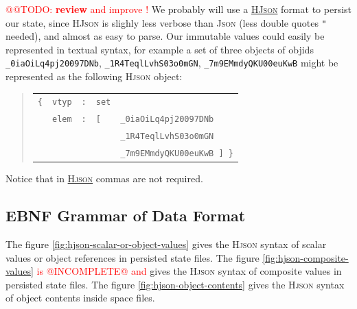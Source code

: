\documentclass[11pt,a4paper,svgnames]{article}
\begin{document}
       
{\textcolor{red}{@@TODO: \textbf{review} and improve !}} We probably will use a \href{http://hjson.org}{\textsc{HJson}} format
to persist our state, since \textsc{HJson} is slighly less verbose
than \textsc{Json} (less double quotes \texttt{"} needed), and almost
as easy to parse. Our immutable values could easily be represented in
textual syntax, for example a set of three objects of objids
\texttt{\_0iaOiLq4pj20097DNb}, \texttt{\_1R4TeqlLvhS03o0mGN},
\texttt{\_7m9EMmdyQKU00euKwB} might be represented as the following
\textsc{Hjson} object:
\begin{quote}
\begin{relsize}{-1}
  \begin{tabular}{lllll}
    \texttt{\{} & \texttt{vtyp} & \texttt{:} & \texttt{set} & ~  \\
    ~           & \texttt{elem} & \texttt{:} & \texttt{[} & \texttt{\_0iaOiLq4pj20097DNb}  \\
    ~           & ~             & ~          & ~           & \texttt{\_1R4TeqlLvhS03o0mGN} \\
    ~           & ~             & ~          & ~           & \texttt{\_7m9EMmdyQKU00euKwB ] \}} \\
  \end{tabular}
\end{relsize}
\end{quote}

\smallskip
Notice that in \href{http://hjson.org/}{\textsc{Hjson}} commas are not required.
\medskip


\subsection{EBNF Grammar of Data Format}
\label{subsec:data-format-ebnf}


The figure \ref{fig:hjson-scalar-or-object-values} gives the
\textsc{Hjson} syntax of scalar values or object references in
persisted state files.  The figure \ref{fig:hjson-composite-values}
\textcolor{red}{is @INCOMPLETE@ and} gives the \textsc{Hjson} syntax
of composite values in persisted state files.  The figure
\ref{fig:hjson-object-contents} gives the \textsc{Hjson} syntax of
object contents inside space files.
\end{document}
